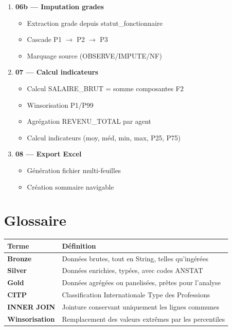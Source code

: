 \documentclass[12pt,a4paper,french]{article}
\begin{document}
\begin{enumerate}
    \item \textbf{06b — Imputation grades}
          \begin{itemize}
              \item Extraction grade depuis statut\_fonctionnaire
              \item Cascade P1 $\rightarrow$ P2 $\rightarrow$ P3
              \item Marquage source (OBSERVE/IMPUTE/NF)
          \end{itemize}

    \item \textbf{07 — Calcul indicateurs}
          \begin{itemize}
              \item Calcul SALAIRE\_BRUT = somme composantes F2
              \item Winsorisation P1/P99
              \item Agrégation REVENU\_TOTAL par agent
              \item Calcul indicateurs (moy, méd, min, max, P25, P75)
          \end{itemize}

    \item \textbf{08 — Export Excel}
          \begin{itemize}
              \item Génération fichier multi-feuilles
              \item Création sommaire navigable
          \end{itemize}
\end{enumerate}

\section{Glossaire}

\begin{tabularx}{\textwidth}{lX}
    \toprule
    \textbf{Terme} & \textbf{Définition} \\
    \midrule
    \textbf{Bronze} & Données brutes, tout en String, telles qu'ingérées \\
    \textbf{Silver} & Données enrichies, typées, avec codes ANSTAT \\
    \textbf{Gold} & Données agrégées ou panelisées, prêtes pour l'analyse \\
    \textbf{CITP} & Classification Internationale Type des Professions \\
    \textbf{INNER JOIN} & Jointure conservant uniquement les lignes communes \\
    \textbf{Winsorisation} & Remplacement des valeurs extrêmes par les percentiles \\
    \bottomrule
\end{tabularx}
\end{document}
